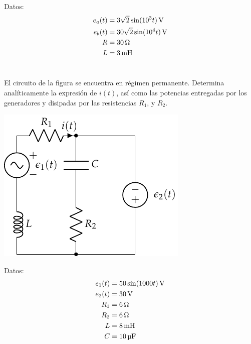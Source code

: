 \documentclass[12pt]{article}
\begin{document}
Datos:
\begin{align*}
  e_a(t) &= \SI[parse-numbers=false]{3\sqrt{2} \sin(10^3 t)}{\volt}\\
  e_b(t) &= \SI[parse-numbers=false]{30\sqrt{2} \sin(10^4 t)}{\volt}\\
  R &= \SI{30}{\ohm}\\
  L &= \SI{3}{\milli\henry}
\end{align*}


\noindent\hrulefill



\clearpage

\section{}

El circuito de la figura se encuentra en régimen permanente. Determina
analíticamente la expresión de $i(t)$, así como las potencias entregadas por los
generadores y disipadas por las resistencias $R_1$, y $R_2$.
\begin{center}
\includegraphics{figs/superposicion1}
\end{center}

Datos:
\begin{align*}
  e_1(t) &= \SI[parse-numbers=false]{50 \sin(1000 t)}{\volt}\\
  e_2(t) &= \SI{30}{\volt}\\
  R_1 &= \SI{6}{\ohm}\\
  R_2 &= \SI{6}{\ohm}\\
  L &= \SI{8}{\milli\henry}\\
  C &= \SI{10}{\micro\farad}
\end{align*}
\end{document}
